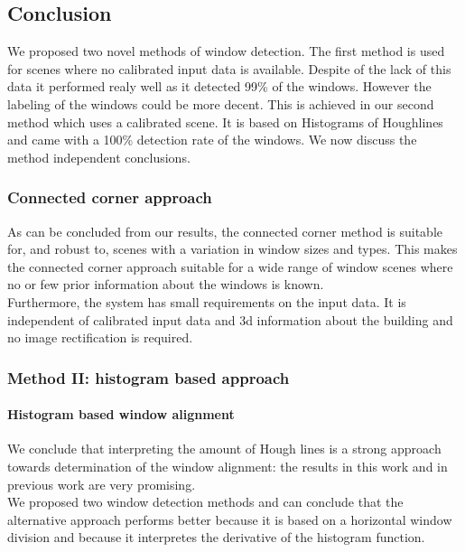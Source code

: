 \subsection{Conclusion}

We proposed two novel methods of window detection. The first method is used for
scenes where no calibrated input data is available. Despite of the lack of this
data it performed realy well as it detected 99\% of the windows. However the 
labeling of the windows could be more decent.  This is achieved in our second
method which uses a calibrated scene.  It is based on Histograms
of Houghlines and came with a 100\% detection rate of the windows.  
We now discuss the method independent conclusions.  

\subsubsection{Connected corner approach} %
As can be concluded from our results, the connected corner method is suitable
for, and robust to, scenes with a variation in window sizes and types. This
	makes the connected corner approach suitable for a wide range of window
	scenes where no or few prior information about the windows is known.\\

Furthermore, the system has small requirements on the input data.
It is independent of calibrated input data and 3d information
about the building and no image rectification is required. \\


\subsubsection{Method II: histogram based approach}
\paragraph{Histogram based window alignment}
We conclude that interpreting the amount of Hough lines is a strong approach
towards determination of the window alignment: the
results in this work and in previous work are very promising.\\

We proposed two window detection methods and can conclude that the alternative
approach performs better because it is based on a horizontal window division and
because it interpretes the derivative of the histogram function.\\

